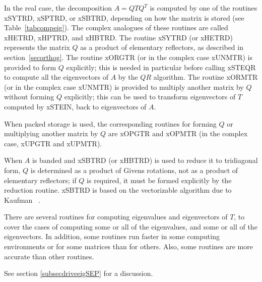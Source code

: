 In the real case, the decomposition $A = Q T Q^T$ is computed by one
of the routines xSYTRD, xSPTRD, or xSBTRD,
depending on how the matrix is
stored (see Table~\ref{tabcompeig}). The complex analogues of these routines
are called xHETRD, xHPTRD, and xHBTRD.
The routine xSYTRD (or xHETRD) represents the
matrix $Q$ as a product of elementary reflectors,
as described in section~\ref{secorthog}.
The routine xORGTR (or in the complex case xUNMTR) is
provided to form $Q$ explicitly;
this is needed in particular
before calling xSTEQR to compute all the eigenvectors of $A$
by the $QR$ algorithm.
The routine xORMTR (or in the complex case xUNMTR)
is provided to multiply another matrix by $Q$
without forming $Q$ explicitly; this can be used to transform
eigenvectors of $T$ computed by xSTEIN, back to eigenvectors of $A$.

When packed storage is used, the corresponding routines for forming $Q$
or multiplying another matrix by $Q$ are xOPGTR and xOPMTR
(in the complex case, xUPGTR and xUPMTR).

When $A$ is banded and xSBTRD (or xHBTRD)
 is used to reduce it to
tridiagonal form, $Q$ is determined as a product of Givens rotations, not
as a product of elementary reflectors; if $Q$ is required, it must be formed
explicitly by the reduction routine.
xSBTRD is based on the vectorizable algorithm due to Kaufman ~\cite{vbandr}.

There are several routines for computing eigenvalues and eigenvectors of $T$,
to cover the cases of computing some or all of the eigenvalues, and some or
all of the eigenvectors. In addition, some routines run faster in some
computing environments or for some matrices than for others. Also,
some routines are more accurate than other routines.

See section \ref{subsecdriveeigSEP} for a discussion.

